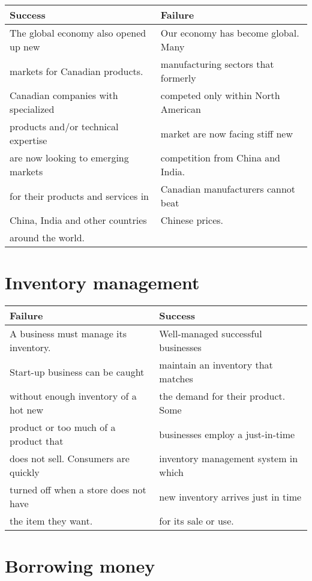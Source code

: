 \documentclass[11pt]{article}
\begin{document}
\begin{center}
\begin{tabular}{ll}
Success & Failure\\
\hline
The global economy also opened up new & Our economy has become global. Many\\
markets for Canadian products. & manufacturing sectors that formerly\\
Canadian companies with specialized & competed only within North American\\
products and/or technical expertise & market are now facing stiff new\\
are now looking to emerging markets & competition from China and India.\\
for their products and services in & Canadian manufacturers cannot beat\\
China, India and other countries & Chinese prices.\\
around the world. & \\
\end{tabular}
\end{center}

\section{Inventory management}
\label{sec:orgce472ec}

\begin{center}
\begin{tabular}{ll}
Failure & Success\\
\hline
A business must manage its inventory. & Well-managed successful businesses\\
Start-up business can be caught & maintain an inventory that matches\\
without enough inventory of a hot new & the demand for their product. Some\\
product or too much of a product that & businesses employ a just-in-time\\
does not sell. Consumers are quickly & inventory management system in which\\
turned off when a store does not have & new inventory arrives just in time\\
the item they want. & for its sale or use.\\
\end{tabular}
\end{center}

\section{Borrowing money}
\label{sec:org715f53a}
\end{document}

